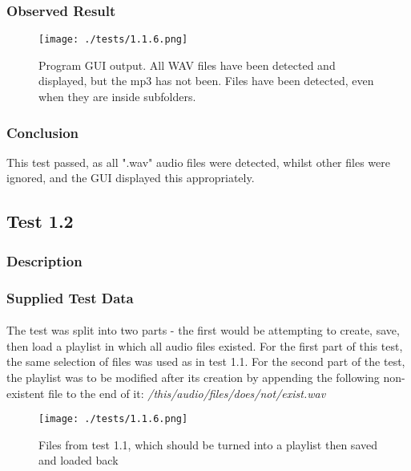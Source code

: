 \subsubsection{Observed Result}
\begin{figure}[H]
	\texttt{[image: ./tests/1.1.6.png]}
	\caption{Program GUI output. All WAV files have been detected and displayed, but the mp3 has not been. Files have been detected, even when they are inside subfolders.}
\end{figure}

\subsubsection{Conclusion}
This test passed, as all ".wav" audio files were detected, whilst other files were ignored, and the GUI displayed this appropriately.


\pagebreak
\subsection{Test 1.2}
\subsubsection{Description}
\paragraph{}
{
	\centering
}

\subsubsection{Supplied Test Data}
\paragraph{}
The test was split into two parts - the first would be attempting to create, save, then load a playlist in which all audio files existed. For the first part of this test, the same selection of files was used as in test 1.1. For the second part of the test, the playlist was to be modified after its creation by appending the following non-existent file to the end of it:
\textit{/this/audio/files/does/not/exist.wav}
\begin{figure}[H]
	\texttt{[image: ./tests/1.1.6.png]}
	\caption{Files from test 1.1, which should be turned into a playlist then saved and loaded back}
\end{figure}

